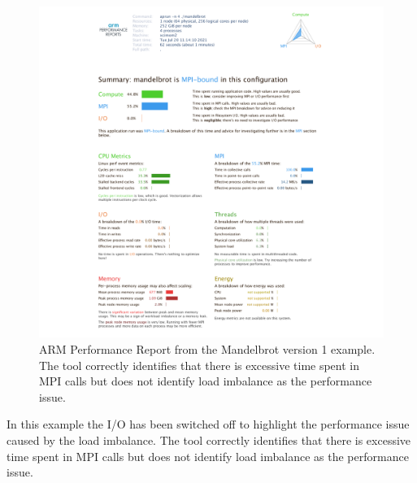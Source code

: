 \documentclass[a4paper,titlepage]{article}
\begin{document}
\begin{figure}[htbp]
\begin{center}
\includegraphics[scale=0.35]{figures/mandelbrot_v1_PerformanceReport}
\caption{ARM Performance Report from the Mandelbrot version 1 example. The tool correctly identifies that there is excessive time spent in MPI calls but does not identify load imbalance as the performance issue.}
\label{fig:perf-report_MB1}
\end{center}
\end{figure}
In this example the I/O has been switched off to highlight the performance issue caused by the load imbalance. The tool correctly identifies that there is excessive time spent in MPI calls but does not identify load imbalance as the performance issue. 
\end{document}
